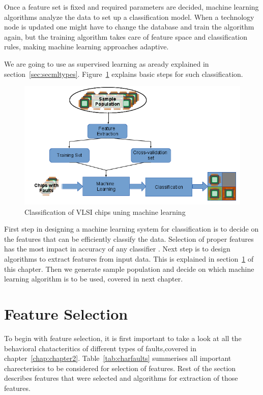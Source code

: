 Once a feature set is fixed and required parameters are decided, machine learning algorithms analyze the data to set up a classification model. When a technology node is updated one might have to change the database and train the algorithm again, but the training algorithm takes care of feature space and classification rules, making machine learning approaches adaptive.

We are going to use as supervised learning as aready explained in section~\ref{sec:secmltypes}. Figure~\ref{fig:mlsteps} explains basic steps for such classification.

\begin{figure}[h]
  \begin{center}
    \captionsetup{justification=centering}
    \includegraphics[scale=0.75]{figures/mlsteps.png}
    \caption{Classification of VLSI chips uning machine learning}
    \label{fig:mlsteps}
  \end{center}
\end{figure}

First step in designing a machine learning system for classification is to decide on the features that can be efficiently classify the data. Selection of proper features has the most impact in accuracy of any classifier \cite{Michie1994}. Next step is to design algorithms to extract features from input data. This is explained in section~\ref{sec:secfs} of this chapter. Then we generate sample population and decide on which machine learning algorithm is to be used, covered in next chapter.

\section{Feature Selection}
\label{sec:secfs}
To begin with feature selection, it is first important to take a look at all the behavioral chatacteritics of different types of faults,covered in chapter~\ref{chap:chapter2}. Table~\ref{tab:charfaults} summerises all important charecterisics to be considered for selection of features. Rest of the section describes features that were selected and algorithms for extraction of those features.

